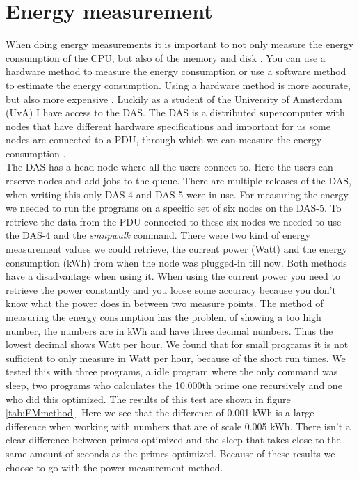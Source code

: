 \chapter{Energy measurement}
\label{ch:energy_measurement}



When doing energy measurements it is important to not only measure the energy consumption of the CPU, but also of the memory and disk \cite{acar2016impact}. You can use a hardware method to measure the energy consumption or use a software method to estimate the energy consumption. Using a hardware method is more accurate, but also more expensive \cite{acar2016impact}. Luckily as a student of the University of Amsterdam (UvA) I have access to the DAS. The DAS is a distributed supercomputer with nodes that have different hardware specifications and important for us some nodes are connected to a PDU, through which we can measure the energy consumption \cite{bal2016medium}.\\

The DAS has a head node where all the users connect to. Here the users can reserve nodes and add jobs to the queue. There are multiple releases of the DAS, when writing this only DAS-4 and DAS-5 were in use. For measuring the energy we needed to run the programs on a specific set of six nodes on the DAS-5. To retrieve the data from the PDU connected to these six nodes we needed to use the DAS-4 and the \textit{smnpwalk} command. There were two kind of energy measurement values we could retrieve, the current power (Watt) and the energy consumption (kWh) from when the node was plugged-in till now. Both methods have a disadvantage when using it. When using the current power you need to retrieve the power constantly and you loose some accuracy because you don't know what the power does in between two measure points. The method of measuring the energy consumption has the problem of showing a too high number, the numbers are in kWh and have three decimal numbers. Thus the lowest decimal shows Watt per hour. We found that for small programs it is not sufficient to only measure in Watt per hour, because of the short run times. We tested this with three programs, a idle program where the only command was sleep, two programs who calculates the 10.000th prime one recursively and one who did this optimized. The results of this test are shown in figure \ref{tab:EMmethod}. Here we see that the difference of 0.001 kWh is a large difference when working with numbers that are of scale 0.005 kWh. There isn't a clear difference between primes optimized and the sleep that takes close to the same amount of seconds as the primes optimized. Because of these results we choose to go with the power measurement method.\\

